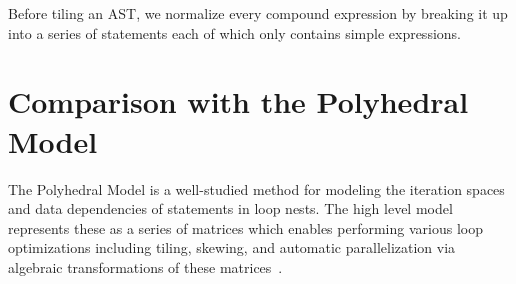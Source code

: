 Before tiling an AST, we normalize every compound expression by breaking it up into a series of statements each of which only contains simple expressions.

\section{Comparison with the Polyhedral Model\label{sec:polyhedral_comparison}}

The Polyhedral Model is a well-studied method for modeling the iteration spaces and data dependencies of statements in loop nests.  The high level model represents these as a series of matrices which enables performing various loop optimizations including tiling, skewing, and automatic parallelization via algebraic transformations of these matrices~\cite{Bena10,Bond08,Hart09,Pouc10,Wolf91a,Wolf91b}.

